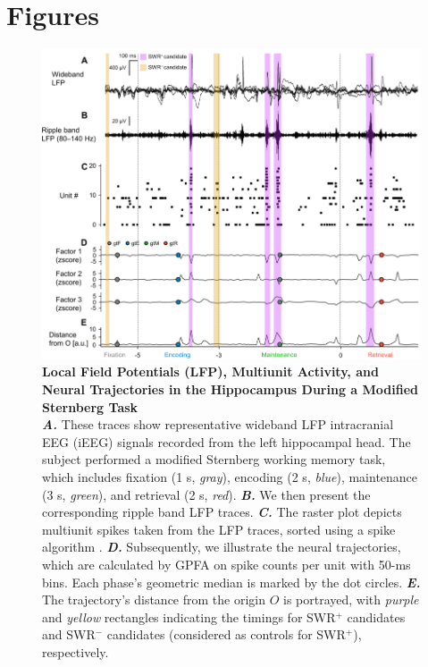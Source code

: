 \documentclass[final,3p,times,twocolumn]{elsarticle}
\begin{document}
\restoregeometry

\clearpage
\section*{Figures}
\label{figures}
        \clearpage
        \begin{figure}[ht]
        	\centering
            \includegraphics[width=1\textwidth]{./src/figures/.png/Figure_ID_01.png}
        	\caption{\textbf{
Local Field Potentials (LFP), Multiunit Activity, and Neural Trajectories in the Hippocampus During a Modified Sternberg Task
}
\smallskip
\\
\textbf{\textit{A.}} These traces show representative wideband LFP intracranial EEG (iEEG) signals recorded from the left hippocampal head. The subject performed a modified Sternberg working memory task, which includes fixation (1 s, \textit{gray}), encoding (2 s, \textit{blue}), maintenance (3 s, \textit{green}), and retrieval (2 s, \textit{red}). \textbf{\textit{B.}} We then present the corresponding ripple band LFP traces. \textbf{\textit{C.}} The raster plot depicts multiunit spikes taken from the LFP traces, sorted using a spike algorithm \cite{niediek_reliable_2016}. \textbf{\textit{D.}} Subsequently, we illustrate the neural trajectories, which are calculated by GPFA on spike counts per unit with 50-ms bins. Each phase's geometric median is marked by the dot circles. \textbf{\textit{E.}} The trajectory's distance from the origin $O$ is portrayed, with \textit{purple} and \textit{yellow} rectangles indicating the timings for SWR$^+$ candidates and SWR$^-$ candidates (considered as controls for SWR$^+$), respectively.
}
        	\label{fig:01}
        \end{figure}
\end{document}
